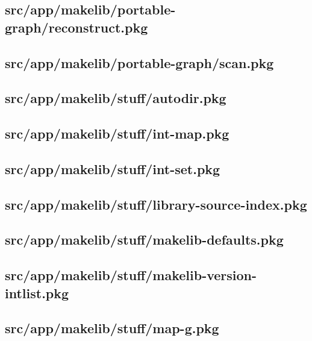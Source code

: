 \subsection{src/app/makelib/portable-graph/reconstruct.pkg}


\subsection{src/app/makelib/portable-graph/scan.pkg}


\subsection{src/app/makelib/stuff/autodir.pkg}


\subsection{src/app/makelib/stuff/int-map.pkg}


\subsection{src/app/makelib/stuff/int-set.pkg}


\subsection{src/app/makelib/stuff/library-source-index.pkg}


\subsection{src/app/makelib/stuff/makelib-defaults.pkg}


\subsection{src/app/makelib/stuff/makelib-version-intlist.pkg}


\subsection{src/app/makelib/stuff/map-g.pkg}


